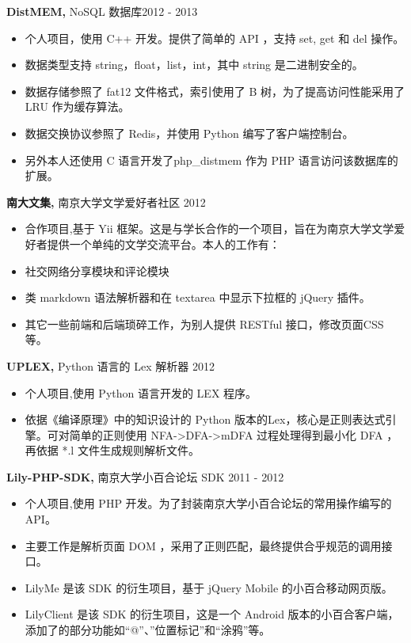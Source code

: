 \documentclass[margin]{res}
\begin{document}
\begin{resume}
 
 
{\bf DistMEM,} NoSQL 数据库\hfill  2012 - 2013
\begin{itemize} \itemsep -2pt
\item 个人项目，使用 C++ 开发。提供了简单的 API ，支持 set, get 和 del 操作。
\item 数据类型支持 string，float，list，int，其中 string 是二进制安全的。
\item 数据存储参照了 fat12 文件格式，索引使用了 B 树，为了提高访问性能采用了 LRU 作为缓存算法。
\item 数据交换协议参照了 Redis，并使用 Python 编写了客户端控制台。
\item 另外本人还使用 C 语言开发了php\_distmem 作为 PHP 语言访问该数据库的扩展。
\end{itemize}

{\bf 南大文集,} 南京大学文学爱好者社区 \hfill 2012
\begin{itemize} \itemsep -2pt
\item 合作项目,基于 Yii 框架。这是与学长合作的一个项目，旨在为南京大学文学爱好者提供一个单纯的文学交流平台。本人的工作有：
\item 社交网络分享模块和评论模块
\item 类 markdown 语法解析器和在 textarea 中显示下拉框的 jQuery 插件。
\item 其它一些前端和后端琐碎工作，为别人提供 RESTful 接口，修改页面CSS等。
\end{itemize}

{\bf UPLEX,} Python 语言的 Lex 解析器 \hfill 2012
\begin{itemize} \itemsep -2pt
\item 个人项目,使用 Python 语言开发的 LEX 程序。
\item 依据《编译原理》中的知识设计的 Python 版本的Lex，核心是正则表达式引擎。可对简单的正则使用 NFA->DFA->mDFA 过程处理得到最小化 DFA ，再依据 *.l 文件生成规则解析文件。
\end{itemize}

{\bf Lily-PHP-SDK,} 南京大学小百合论坛 SDK \hfill 2011 - 2012
\begin{itemize} \itemsep -2pt
\item 个人项目,使用 PHP 开发。为了封装南京大学小百合论坛的常用操作编写的 API。
\item 主要工作是解析页面 DOM ，采用了正则匹配，最终提供合乎规范的调用接口。
\item LilyMe 是该 SDK 的衍生项目，基于 jQuery Mobile 的小百合移动网页版。
\item LilyClient 是该 SDK 的衍生项目，这是一个 Android 版本的小百合客户端，添加了的部分功能如“@”、”位置标记”和“涂鸦”等。
\end{itemize}


\end{resume}
\end{document}
